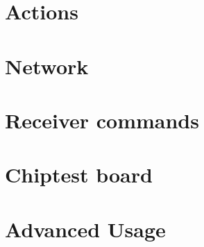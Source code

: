 \documentclass[a4paper]{article}
\begin{document}
\section{Actions}
\label{actions}
\hypertarget{actions}{}

\section{Network}
\label{network}
\hypertarget{network}{}

\section{Receiver commands}
\label{receiver}
\hypertarget{receiver}{}

\section{Chiptest board}
\label{ctb}
\hypertarget{ctb}{}

\section{Advanced Usage}
\label{advanced}
\hypertarget{advanced}{}

\printindex
\end{document}
